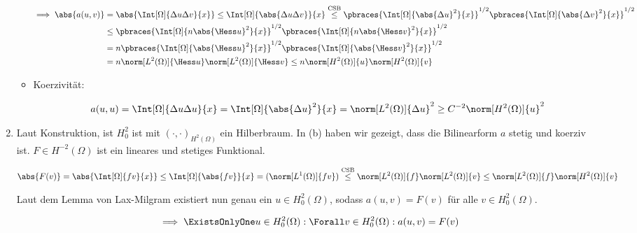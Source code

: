 \begin{solution}
\begin{enumerate}[label = (\alph*)]
\begin{itemize}
    \begin{align*}
      \implies
      \abs{a(u, v)}
      & =
      \abs{\Int[\Omega]{\Delta u \Delta v}{x}}
      \leq
      \Int[\Omega]{\abs{\Delta u \Delta v}}{x}
      \stackrel
      {
        \mathrm{CSB}
      }{\leq}
      \pbraces
      {
        \Int[\Omega]{\abs{\Delta u}^2}{x}
      }^{1/2}
      \pbraces
      {
        \Int[\Omega]{\abs{\Delta v}^2}{x}
      }^{1/2} \\
      & \leq
      \pbraces
      {
        \Int[\Omega]{n \abs{\Hess u}^2}{x}
      }^{1/2}
      \pbraces
      {
        \Int[\Omega]{n \abs{\Hess v}^2}{x}
      }^{1/2} \\
      & =
      n
      \pbraces
      {
        \Int[\Omega]{\abs{\Hess u}^2}{x}
      }^{1/2}
      \pbraces
      {
        \Int[\Omega]{\abs{\Hess v}^2}{x}
      }^{1/2} \\
      & =
      n \norm[L^2(\Omega)]{\Hess u} \norm[L^2(\Omega)]{\Hess v}
      \leq
      n \norm[H^2(\Omega)]{u} \norm[H^2(\Omega)]{v}
    \end{align*}

    \item Koerzivität:

    \begin{align*}
      a(u, u)
      =
      \Int[\Omega]{\Delta u \Delta u}{x}
      =
      \Int[\Omega]{\abs{\Delta u}^2}{x}
      =
      \norm[L^2(\Omega)]{\Delta u}^2
      \geq
      C^{-2} \norm[H^2(\Omega)]{u}^2
    \end{align*}

  \end{itemize}

  \item Laut Konstruktion, ist $H_0^2$ ist mit $(\cdot, \cdot)_{H^2(\Omega)}$ ein Hilberbraum.
  In (b) haben wir gezeigt, dass die Bilinearform $a$ stetig und koerziv ist.
  $F \in H^{-2}(\Omega)$ ist ein lineares und stetiges Funktional.

  \begin{align*}
    \abs{F(v)}
    =
    \abs{\Int[\Omega]{f v}{x}}
    \leq
    \Int[\Omega]{\abs{f v}}{x}
    =
    (\norm[L^1(\Omega)]{f v})
    \stackrel
    {
      \mathrm{CSB}
    }{\leq}
    \norm[L^2(\Omega)]{f} \norm[L^2(\Omega)]{v}
    \leq
    \norm[L^2(\Omega)]{f} \norm[H^2(\Omega)]{v}
  \end{align*}

  Laut dem Lemma von Lax-Milgram existiert nun genau ein $u \in H_0^2(\Omega)$, sodass $a(u, v) = F(v)$ für alle $v \in H_0^2(\Omega)$.

  \begin{align*}
      \implies
      \ExistsOnlyOne u \in H_0^2(\Omega):
      \Forall v \in H_0^2(\Omega):
      a(u, v) = F(v)
  \end{align*}

\end{enumerate}

\end{solution}

